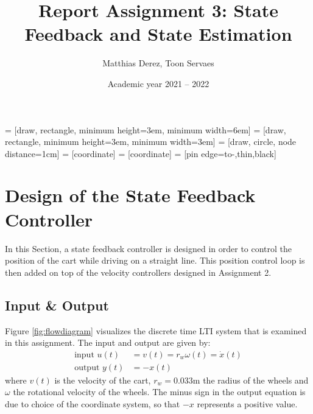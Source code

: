 \documentclass[a4paper,kul]{kulakarticle} %
\date{Academic year 2021 -- 2022}
\title{Report Assignment 3: State Feedback and State Estimation}
\author{Matthias Derez, Toon Servaes}
\begin{document}
\maketitle

\tableofcontents
\listoffigures
\listoftables

 = [draw, rectangle, 
minimum height=3em, minimum width=6em]
 = [draw, rectangle, 
minimum height=3em, minimum width=3em]
 = [draw, circle, node distance=1cm]
 = [coordinate]
 = [coordinate]
 = [pin edge={to-,thin,black}]



\newpage
\section{Design of the State Feedback Controller}
In this Section, a state feedback controller is designed in order to control the position of the cart while driving on a straight line. This position control loop is then added on top of the velocity controllers designed in Assignment 2. 

\subsection{Input \& Output}
Figure \ref{fig:flowdiagram} visualizes the discrete time LTI system that is examined in this assignment. The input and output are given by:
\begin{equation}
	\begin{split}
	\text{input } u(t) &= v(t) = r_w\omega(t) = \dot{x}(t) \\
	\text{output } y(t) &= -x(t)
	\end{split}
\end{equation}
where $v(t)$ is the velocity of the cart, $r_w = 0.033$m the radius of the wheels and $\omega$ the rotational velocity of the wheels. The minus sign in the output equation is due to choice of the coordinate system, so that $-x$ represents a positive value. 
\end{document}
